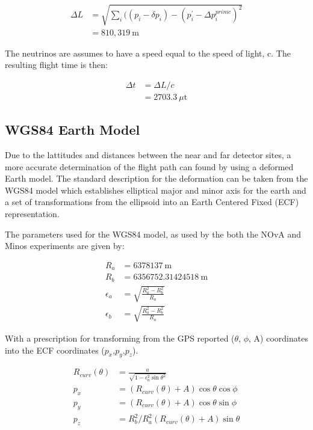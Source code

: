 \begin{align}
\Delta L &= \sqrt{\sum_{i} ( (p_i - \delta p_i) - (p_i^\prime - \Delta
  p_i^{prime})^2} \\
             &= 810,319~\text{m}
\end{align}

The neutrinos are assumes to have a speed equal to the speed of light,
c.  The resulting flight time is then:

\begin{align}
\Delta t &= \Delta L / c\\
             &= 2703.3~\mu\text{t}
\end{align}

\subsection{WGS84 Earth Model}

Due to the lattitudes and distances between the near and far detector
sites, a more accurate determination of the flight path can found by
using a deformed Earth model.  The standard description for the
deformation can be taken from the WGS84 model which establishes
elliptical major and minor axis for the earth and a set of
transformations from the ellipsoid into an Earth Centered Fixed (ECF)
representation.

The parameters used for the WGS84 model, as used by the both the NOvA
and Minos experiments are given by:

\begin{align}
R_a &= 6378137 ~\text{m}\\
R_b &= 6356752.31424518 ~\text{m}\\
\epsilon_a &= \sqrt{\frac{R^2_a - R^2_b}{R_a}}\\
\epsilon_b &= \sqrt{\frac{R^2_a - R^2_b}{R_a}}
\end{align}

With a prescription for transforming from the GPS reported ($\theta$,
$\phi$, A) coordinates into the ECF coordinates ($p_x$,$p_y$,$p_z$).

\begin{align}
R_{curv}(\theta) &= \frac{a}{\sqrt{1-\epsilon^2_a \sin \theta^2}} \\
p_x &= (R_{curv}(\theta) + A) \cos \theta \cos \phi \\
p_y &= (R_{curv}(\theta) + A) \cos \theta \sin \phi \\
p_z &= R^2_b/R^2_a (R_{curv}(\theta) + A) \sin \theta
\end{align}

